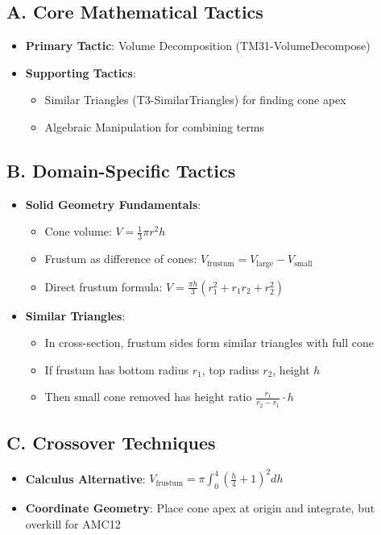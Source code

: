 \documentclass[]{article}
\begin{document}
\begin{tacticalbox}
\subsection*{A. Core Mathematical Tactics}
\begin{itemize}[leftmargin=*]
    \item \textbf{Primary Tactic}: Volume Decomposition (TM31-VolumeDecompose)
    \item \textbf{Supporting Tactics}:
    \begin{itemize}
        \item Similar Triangles (T3-SimilarTriangles) for finding cone apex
        \item Algebraic Manipulation for combining terms
    \end{itemize}
\end{itemize}

\subsection*{B. Domain-Specific Tactics}
\begin{itemize}[leftmargin=*]
    \item \textbf{Solid Geometry Fundamentals}:
    \begin{itemize}
        \item Cone volume: $V = \frac{1}{3}\pi r^2 h$
        \item Frustum as difference of cones: $V_{\text{frustum}} = V_{\text{large}} - V_{\text{small}}$
        \item Direct frustum formula: $V = \frac{\pi h}{3}(r_1^2 + r_1 r_2 + r_2^2)$
    \end{itemize}
    \item \textbf{Similar Triangles}:
    \begin{itemize}
        \item In cross-section, frustum sides form similar triangles with full cone
        \item If frustum has bottom radius $r_1$, top radius $r_2$, height $h$
        \item Then small cone removed has height ratio $\frac{r_1}{r_2-r_1} \cdot h$
    \end{itemize}
\end{itemize}

\subsection*{C. Crossover Techniques}
\begin{itemize}[leftmargin=*]
    \item \textbf{Calculus Alternative}: $V_{\text{frustum}} = \pi \int_0^4 \left(\frac{h}{4}+1\right)^2 dh$
    \item \textbf{Coordinate Geometry}: Place cone apex at origin and integrate, but overkill for AMC12
\end{itemize}
\end{tacticalbox}
\end{document}

